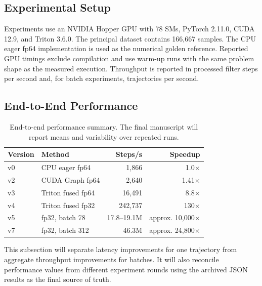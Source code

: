 \documentclass[research]{fcs}
\begin{document}
\subsection{Experimental Setup}
\label{subsec:experimental-setup}

Experiments use an NVIDIA Hopper GPU with 78 SMs, PyTorch 2.11.0, CUDA 12.9, and Triton 3.6.0. The principal dataset contains 166,667 samples. The CPU eager fp64 implementation is used as the numerical golden reference. Reported GPU timings exclude compilation and use warm-up runs with the same problem shape as the measured execution. Throughput is reported in processed filter steps per second and, for batch experiments, trajectories per second.


\subsection{End-to-End Performance}
\label{subsec:end-to-end}

\begin{table}[!t]
  \centering
  \caption{End-to-end performance summary. The final manuscript will report means and variability over repeated runs.}
  \label{tab:end-to-end}
  \begin{tabular}{@{}llrr@{}}
    \toprule
    Version & Method & Steps/s & Speedup \\
    \midrule
    v0 & CPU eager fp64 & 1,866 & 1.0$\times$ \\
    v2 & CUDA Graph fp64 & 2,640 & 1.41$\times$ \\
    v3 & Triton fused fp64 & 16,491 & 8.8$\times$ \\
    v4 & Triton fused fp32 & 242,737 & 130$\times$ \\
    v5 & fp32, batch 78 & 17.8--19.1M & approx. 10,000$\times$ \\
    v7 & fp32, batch 312 & 46.3M & approx. 24,800$\times$ \\
    \bottomrule
  \end{tabular}
\end{table}

This subsection will separate latency improvements for one trajectory from aggregate throughput improvements for batches. It will also reconcile performance values from different experiment rounds using the archived JSON results as the final source of truth.
\end{document}
